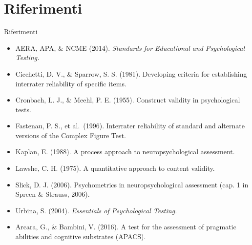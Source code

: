 \documentclass[
  ignorenonframetext,
]{beamer}
\providecommand{\tightlist}{%
  \setlength{\itemsep}{0pt}\setlength{\parskip}{0pt}}
\begin{document}
\section{Riferimenti}\label{riferimenti}

\begin{frame}{Riferimenti}
\label{riferimenti-1}
\footnotesize

\begin{itemize}
\tightlist
\item
  AERA, APA, \& NCME (2014). \emph{Standards for Educational and
  Psychological Testing.}
\item
  Cicchetti, D. V., \& Sparrow, S. S. (1981). Developing criteria for
  establishing interrater reliability of specific items.
\item
  Cronbach, L. J., \& Meehl, P. E. (1955). Construct validity in
  psychological tests.
\item
  Fastenau, P. S., et al.~(1996). Interrater reliability of standard and
  alternate versions of the Complex Figure Test.
\item
  Kaplan, E. (1988). A process approach to neuropsychological
  assessment.
\item
  Lawshe, C. H. (1975). A quantitative approach to content validity.
\item
  Slick, D. J. (2006). Psychometrics in neuropsychological assessment
  (cap. 1 in Spreen \& Strauss, 2006).
\item
  Urbina, S. (2004). \emph{Essentials of Psychological Testing.}
\item
  Arcara, G., \& Bambini, V. (2016). A test for the assessment of
  pragmatic abilities and cognitive substrates (APACS).
\end{itemize}
\end{frame}
\end{document}
